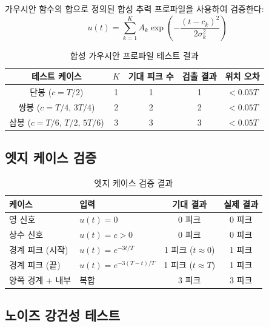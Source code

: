 \documentclass[11pt]{article}
\begin{document}
가우시안 함수의 합으로 정의된 합성 추력 프로파일을 사용하여 검증한다:
\begin{equation}
  u(t) = \sum_{k=1}^{K} A_k \exp\!\left(-\frac{(t - c_k)^2}{2\sigma_k^2}\right)
  \label{eq:synthetic}
\end{equation}

\begin{table}[h]
\centering
\caption{합성 가우시안 프로파일 테스트 결과}
\label{tab:synthetic}
\begin{tabular}{ccccc}
\toprule
테스트 케이스 & $K$ & 기대 피크 수 & 검출 결과 & 위치 오차 \\
\midrule
단봉 ($c = T/2$) & 1 & 1 & 1 & $< 0.05T$ \\
쌍봉 ($c = T/4,\, 3T/4$) & 2 & 2 & 2 & $< 0.05T$ \\
삼봉 ($c = T/6,\, T/2,\, 5T/6$) & 3 & 3 & 3 & $< 0.05T$ \\
\bottomrule
\end{tabular}
\end{table}

\subsection{엣지 케이스 검증}

\begin{table}[h]
\centering
\caption{엣지 케이스 검증 결과}
\label{tab:edge}
\begin{tabular}{llcc}
\toprule
케이스 & 입력 & 기대 결과 & 실제 결과 \\
\midrule
영 신호 & $u(t) = 0$ & 0 피크 & 0 피크 \\
상수 신호 & $u(t) = c > 0$ & 0 피크 & 0 피크 \\
경계 피크 (시작) & $u(t) = e^{-3t/T}$ & 1 피크 ($t \approx 0$) & 1 피크 \\
경계 피크 (끝) & $u(t) = e^{-3(T-t)/T}$ & 1 피크 ($t \approx T$) & 1 피크 \\
양쪽 경계 + 내부 & 복합 & 3 피크 & 3 피크 \\
\bottomrule
\end{tabular}
\end{table}

\subsection{노이즈 강건성 테스트}
\end{document}
